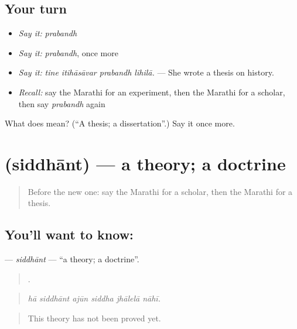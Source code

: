 \subsection*{Your turn}
\begin{itemize}
\raggedright
  \item \emph{Say it:} \emph{prabandh}
  \item \emph{Say it:} \emph{prabandh}, once more
  \item \emph{Say it:} \emph{tine itihāsāvar prabandh lihilā.} — She wrote a thesis on history.
  \item \emph{Recall:} say the Marathi for an experiment, then the Marathi for a scholar, then say \emph{prabandh} again
\end{itemize}

\begin{tcolorbox}[breakable,colback=teal!4,colframe=teal!35!black,title={Before you move on}]
What does  mean? (\textquotedblleft{}A thesis; a dissertation\textquotedblright{}.) Say it once more.
\end{tcolorbox}
\section[\texorpdfstring{\mr{सिद्धांत} (siddhānt)}{सिद्धांत (siddhānt)}]{ (siddhānt) — a theory; a doctrine}

\label{lesson:MR-C372-siddhant}



\begin{quote}
Before the new one: say the Marathi for a scholar, then the Marathi for a thesis.
\end{quote}

\subsection*{You'll want to know: }
\textbf{} — \emph{siddhānt} — \textquotedblleft{}a theory; a doctrine\textquotedblright{}.

\begin{quote}
     .
\end{quote}

\begin{quote}
\emph{hā siddhānt ajūn siddha jhālelā nāhī.}
\end{quote}

\begin{quote}
This theory has not been proved yet.
\end{quote}

